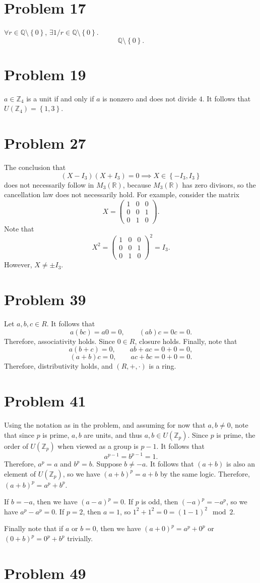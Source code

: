 \documentclass[11pt, letterpaper]{article}
\begin{document}
\section*{Problem 17}
$\forall r\in\mathbb{Q}\setminus \left\{ 0 \right\} $, $\exists 1 /r\in\mathbb{Q} \setminus \left\{ 0 \right\} $.
\[
	\mathbb{Q}\setminus \left\{ 0 \right\} 
.\]
\section*{Problem 19}
$a\in\mathbb{Z}_4$ is a unit if and only if $a$ is nonzero and does not divide $4$. It follows that $U(\mathbb{Z}_4)=\left\{ 1,3 \right\} $.
\section*{Problem 27}
The conclusion that
\[
	(X-I_3)(X+I_3)=0 \implies X\in \left\{-I_3, I_3 \right\} 
\]
does not necessarily follow in $M_3(\mathbb{R})$, because $M_3(\mathbb{R})$ has zero divisors, so the cancellation law does not necessarily hold. For example, consider the matrix
\[
	X=\begin{pmatrix}
		1&0&0\\
		0&0&1\\
		0&1&0
	\end{pmatrix} 
.\]
Note that
\[
	X^2 = \begin{pmatrix}
		1&0&0\\
		0&0&1\\
		0&1&0
	\end{pmatrix} ^2 = I_3
.\]
However, $X\neq \pm I_3$.
\section*{Problem 39}
Let $a,b,c\in R$. It follows that
\[
	a(bc)=a0=0,\qquad (ab)c=0c=0
.\]
Therefore, associativity holds. Since $0\in R$, closure holds. Finally, note that
\[
	a(b+c)=0,\qquad ab+ac=0+0=0
,\]
\[
	(a+b)c=0,\qquad ac+bc=0+0=0
.\]
Therefore, distributivity holds, and $(R,+,\cdot )$ is a ring.
\section*{Problem 41}
Using the notation as in the problem, and assuming for now that $a,b\neq 0$, note that since $p$ is prime, $a,b$ are units, and thus $a,b\in U(\mathbb{Z}_p)$. Since $p$ is prime, the order of $U(\mathbb{Z}_p)$ when viewed as a group is $p-1$. It follows that
\[
	a^{p-1}=b^{p-1}=1
.\]
Therefore, $a^p=a$ and $b^p=b$. Suppose $b\neq -a$. It follows that $(a+b)$ is also an element of $U(\mathbb{Z}_p)$, so we have $(a+b)^p=a+b$ by the same logic. Therefore, $(a+b)^p=a^p+b^p$.

If $b=-a$, then we have $(a-a)^p=0$. If $p$ is odd, then $(-a)^p=-a^p$, so we have $a^p-a^p=0$. If $p=2$, then $a=1$, so $1^2+1^2= 0= (1-1)^2 \mod{2} $.

Finally note that if $a$ or $b=0$, then we have $(a+0)^p=a^p+0^p$ or $(0+b)^p=0^p+b^p$ trivially.
\section*{Problem 49}
\end{document}

